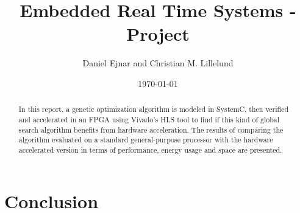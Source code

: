\documentclass{article}
\title{Embedded Real Time Systems - Project}
\author{Daniel Ejnar and Christian M. Lillelund}
\date{\today}
\begin{document}
\maketitle
\begin{abstract}
	In this report, a genetic optimization algorithm is modeled in SystemC, then verified and accelerated in an FPGA using Vivado's HLS tool to find if this kind of global search algorithm benefits from hardware acceleration. The results of comparing the algorithm evaluated on a standard general-purpose processor with the hardware accelerated version in terms of performance, energy usage and space are presented.
\end{abstract}














\section{Conclusion}


\end{document}
